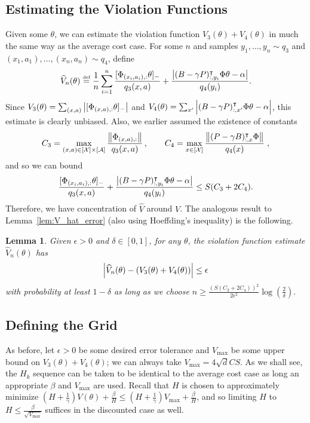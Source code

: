 \documentclass[11pt]{article}
\newtheorem{lemma}[theorem]{Lemma}
\newcommand{\df}{\stackrel{\mbox{\rm\tiny def}}{=}}
\begin{document}
\subsection{Estimating the Violation Functions}
\label{sec:estimate.V}
Given some $\theta$, we can estimate the violation function $V_3(\theta) + V_4(\theta)$ in much the same way as the average cost case. For some $n$ and samples $y_1,\ldots, y_n\sim q_3$ and $(x_1,a_1),\ldots,(x_n,a_n)\sim q_4$, define
\begin{equation}
  \widehat V_n(\theta) \df \frac{1}{n}\sum_{i=1}^n  \frac{[\Phi_{(x_i,a_i),:}\theta]_-}{q_3(x,a)}
  +\frac{\abs{(B-\gamma P)_{:,y_i}^\top \Phi\theta-\alpha}}{q_4(y_i)} .
\end{equation}
Since $ V_3(\theta) =\sum_{(x,a)} \left\vert [\Phi_{(x,a),:}\theta]_{-}\right\vert$ and
$V_4(\theta) = \sum_{x'} \left\vert(B- \gamma P)_{:,x'}^\intercal \Phi \theta -\alpha\right\vert$, this estimate is clearly unbiased. Also, we earlier assumed the existence of constants
\begin{align*}
C_3 = \max_{(x,a)\in [{\cal X}]\times [{\cal A}]}\frac{\left\Vert\Phi_{(x,a),:}\right\Vert}{q_3(x, a)}\,, \qquad C_4 = \max_{x\in [{\cal X}]}\frac{\left\Vert(P - \gamma B)_{:,x}^\intercal \Phi\right\Vert}{q_4(x)} \; ,
\end{align*}
and so we can bound
\begin{align*}
  \frac{[\Phi_{(x_i,a_i),:}\theta]_-}{q_3(x,a)}
  +\frac{\left\vert(B-\gamma P)_{:,y_i}^\intercal \Phi\theta-\alpha\right\vert}{q_4(y_i)}
  \leq
  S(C_3 + 2C_4).
\end{align*}
Therefore, we have concentration of $\widehat V$ around $V$. The analogous result to Lemma~\ref{lem:V_hat_error} (also using Hoeffding's inequality) is the following.
\begin{lemma}
  \label{lem:V_hat_error_discounted}
  Given $\epsilon>0$ and $\delta \in [0,1]$, for any $\theta$, the violation function estimate $\widehat V_n(\theta)$ has
  \begin{equation*}
    \left\vert\widehat V_n(\theta) - (V_3(\theta) + V_4(\theta))\right\vert \leq \epsilon
  \end{equation*}
    with probability at least $1-\delta$ as long as we choose
  $
    n \geq  \frac{(S(C_3 + 2C_4))^2}{2\epsilon^2}\log\left(\frac{2}{\delta}\right).
  $
\end{lemma}

\subsection{Defining the Grid}
As before, let $\epsilon>0$ be some desired error tolerance and $V_{\max}$ be some upper bound on $V_3(\theta) + V_4(\theta)$; we can always take $V_{\max}= 4\sqrt{d}CS$. As we shall see, the $H_k$ sequence can be taken to be identical to the average cost case as long an appropriate $\beta$ and $V_{\max}$ are used. Recall that $H$ is chosen to approximately minimize $\left(H+\frac{1}{\gamma}\right) V(\theta) + \frac{\beta}{H} \leq \left(H+\frac{1}{\gamma}\right) V_{\max} + \frac{\beta}{H}$, and so limiting $H$ to $H \leq \frac{\beta}{\sqrt{V_{\max}}}$ suffices in the discounted case as well.
\end{document}
